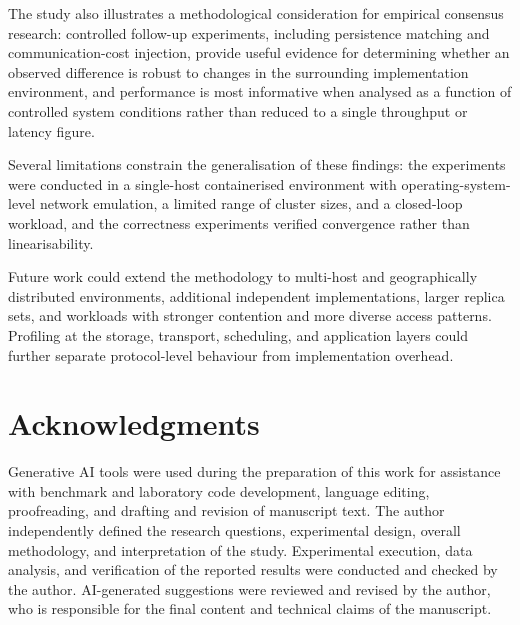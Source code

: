 The study also illustrates a methodological consideration for empirical consensus research: controlled follow-up experiments, including persistence matching and communication-cost injection, provide useful evidence for determining whether an observed difference is robust to changes in the surrounding implementation environment, and performance is most informative when analysed as a function of controlled system conditions rather than reduced to a single throughput or latency figure.

Several limitations constrain the generalisation of these findings: the experiments were conducted in a single-host containerised environment with operating-system-level network emulation, a limited range of cluster sizes, and a closed-loop workload, and the correctness experiments verified convergence rather than linearisability.

Future work could extend the methodology to multi-host and geographically distributed environments, additional independent implementations, larger replica sets, and workloads with stronger contention and more diverse access patterns. Profiling at the storage, transport, scheduling, and application layers could further separate protocol-level behaviour from implementation overhead.

\section*{Acknowledgments}

Generative AI tools were used during the preparation of this work for assistance with benchmark and laboratory code development, language editing, proofreading, and drafting and revision of manuscript text. The author independently defined the research questions, experimental design, overall methodology, and interpretation of the study. Experimental execution, data analysis, and verification of the reported results were conducted and checked by the author. AI-generated suggestions were reviewed and revised by the author, who is responsible for the final content and technical claims of the manuscript.
